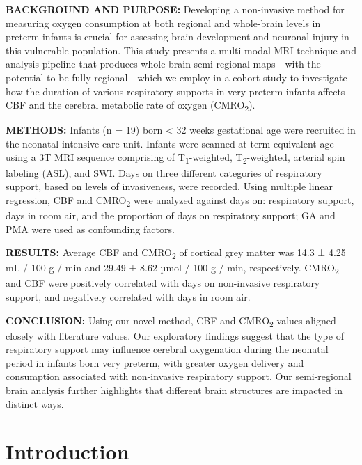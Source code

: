 \documentclass[
  letterpaper,
  DIV=11,
  numbers=noendperiod]{scrartcl}
\begin{document}
\textbf{BACKGROUND AND PURPOSE:} Developing a non-invasive method for
measuring oxygen consumption at both regional and whole-brain levels in
preterm infants is crucial for assessing brain development and neuronal
injury in this vulnerable population. This study presents a multi-modal
MRI technique and analysis pipeline that produces whole-brain
semi-regional maps - with the potential to be fully regional - which we
employ in a cohort study to investigate how the duration of various
respiratory supports in very preterm infants affects CBF and the
cerebral metabolic rate of oxygen (CMRO\textsubscript{2}).

\textbf{METHODS:} Infants (n = 19) born \textless{} 32 weeks gestational
age were recruited in the neonatal intensive care unit. Infants were
scanned at term-equivalent age using a 3T MRI sequence comprising of
T\textsubscript{1}-weighted, T\textsubscript{2}-weighted, arterial spin
labeling (ASL), and SWI. Days on three different categories of
respiratory support, based on levels of invasiveness, were recorded.
Using multiple linear regression, CBF and CMRO\textsubscript{2} were
analyzed against days on: respiratory support, days in room air, and the
proportion of days on respiratory support; GA and PMA were used as
confounding factors.

\textbf{RESULTS:} Average CBF and CMRO\textsubscript{2} of cortical grey
matter was 14.3 ± 4.25 mL / 100 g / min and 29.49 ± 8.62 µmol / 100 g /
min, respectively. CMRO\textsubscript{2} and CBF were positively
correlated with days on non-invasive respiratory support, and negatively
correlated with days in room air.

\textbf{CONCLUSION:} Using our novel method, CBF and
CMRO\textsubscript{2} values aligned closely with literature values. Our
exploratory findings suggest that the type of respiratory support may
influence cerebral oxygenation during the neonatal period in infants
born very preterm, with greater oxygen delivery and consumption
associated with non-invasive respiratory support. Our semi-regional
brain analysis further highlights that different brain structures are
impacted in distinct ways.

\section{Introduction}\label{sec-intro}
\end{document}
